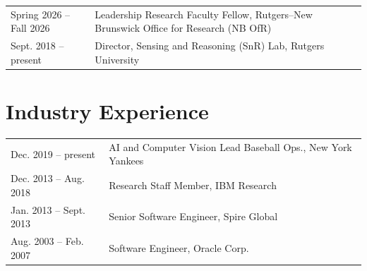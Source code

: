 \documentclass[12pt]{article}
\begin{document}
\begin{tabularx}{\textwidth}{@{}l X@{}}
Spring 2026 -- Fall 2026 & Leadership Research Faculty Fellow, Rutgers--New Brunswick Office for Research (NB OfR) \\
Sept. 2018 -- present & Director, Sensing and Reasoning (SnR) Lab, Rutgers University \\
\end{tabularx}

\section{Industry Experience}

\begin{tabular}{l l}
Dec. 2019 -- present & AI and Computer Vision Lead Baseball Ops., New York Yankees \\
Dec. 2013 -- Aug. 2018 & Research Staff Member, IBM Research \\
Jan. 2013 -- Sept. 2013 & Senior Software Engineer, Spire Global \\
Aug. 2003 -- Feb. 2007 & Software Engineer, Oracle Corp. \\
\end{tabular}
\end{document}

